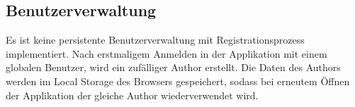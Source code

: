 \subsection{Benutzerverwaltung}
Es ist keine persistente Benutzerverwaltung mit Registrationsprozess implementiert.
Nach erstmaligem Anmelden in der Applikation mit einem globalen Benutzer, wird ein zufälliger Author erstellt.
Die Daten des Authors werden im Local Storage des Browsers gespeichert, sodass bei erneutem Öffnen der Applikation der gleiche Author wiederverwendet wird.
